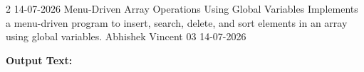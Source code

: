 \clearpage
\label{prog:02}
\programhead
  {2}
  {14-07-2026}
  {Menu-Driven Array Operations Using Global Variables}
  {Implements a menu-driven program to insert, search, delete, and sort elements in an array using global variables.}
  {Abhishek Vincent}
  {03}
  {14-07-2026}

\divider
\textbf{Output Text:}\par
\vspace{2pt}


